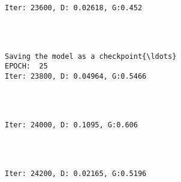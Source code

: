 \documentclass[11pt]{article}
\begin{document}
    \begin{Verbatim}[commandchars=\\\{\}]

Iter: 23600, D: 0.02618, G:0.452
    \end{Verbatim}

    \begin{center}
    \end{center}
    { \hspace*{\fill} \\}
    
    \begin{Verbatim}[commandchars=\\\{\}]

Saving the model as a checkpoint{\ldots}
EPOCH:  25
Iter: 23800, D: 0.04964, G:0.5466
    \end{Verbatim}

    \begin{center}
    \end{center}
    { \hspace*{\fill} \\}
    
    \begin{Verbatim}[commandchars=\\\{\}]

Iter: 24000, D: 0.1095, G:0.606
    \end{Verbatim}

    \begin{center}
    \end{center}
    { \hspace*{\fill} \\}
    
    \begin{Verbatim}[commandchars=\\\{\}]

Iter: 24200, D: 0.02165, G:0.5196
    \end{Verbatim}

    \begin{center}
    \end{center}
    { \hspace*{\fill} \\}
    
\end{document}
